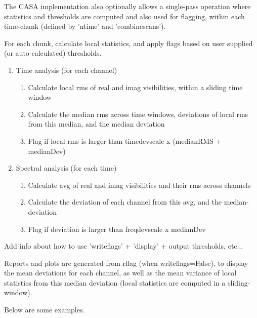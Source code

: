 The CASA implementation also optionally allows a single-pass operation where statistics
and thresholds are computed and also used for flagging, within each time-chunk
(defined by 'ntime' and 'combinescans'). 

For each chunk, calculate local
                         statistics, and apply flags based on user supplied (or auto-calculated) thresholds.

\begin{enumerate}
\item Time analysis (for each channel)
\begin{enumerate}
\item Calculate local rms of real and imag visibilities, within a sliding time window
\item Calculate the median rms across time windows, deviations of local rms from
                              this median, and the median deviation 
\item Flag if local rms is larger than timedevscale x (medianRMS + medianDev)
\end{enumerate}
\item Spectral analysis (for each time)
\begin{enumerate}

\item Calculate avg of real and imag visibilities and their rms across channels
\item Calculate the deviation of each channel from this avg, and the median-deviation
\item Flag if deviation is larger than freqdevscale x medianDev
\end{enumerate}

\end{enumerate}

{\red Add info about how to use 'writeflags' + 'display' + output thresholds, etc...}

Reports and plots are generated from rflag (when writeflags=False), to display
the mean deviations for each channel, as well as the mean variance of 
local statistics from this median deviation (local statistics are computed in a 
sliding-window). 


Below are some examples. 

